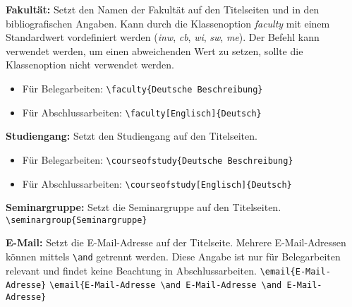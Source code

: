 \documentclass[
%
	thesis=paper,		%
	compactlistof,		%
	noauthorship,		%
%
	fancy,				%
%
%
]{hsmw-thesis}
\begin{document}
	\textbf{Fakultät:}\label{cmd:faculty}
	Setzt den Namen der Fakultät auf den Titelseiten und in den bibliografischen Angaben.
	Kann durch die Klassenoption \textit{faculty} mit einem Standardwert vordefiniert werden (\textit{inw}, \textit{cb}, \textit{wi}, \textit{sw}, \textit{me}).
	Der Befehl kann verwendet werden, um einen abweichenden Wert zu setzen, sollte die Klassenoption nicht verwendet werden.
	\begin{itemize}
		\item Für Belegarbeiten: \verb|\faculty{Deutsche Beschreibung}|
		\item Für Abschlussarbeiten: \verb|\faculty[Englisch]{Deutsch}|
	\end{itemize}
	
	\textbf{Studiengang:}\label{cmd:courseofstudy}
	Setzt den Studiengang auf den Titelseiten.
	\begin{itemize}
		\item Für Belegarbeiten: \verb|\courseofstudy{Deutsche Beschreibung}|
		\item Für Abschlussarbeiten: \verb|\courseofstudy[Englisch]{Deutsch}|
	\end{itemize}
	
	\textbf{Seminargruppe:}\label{cmd:seminargroup}
	Setzt die Seminargruppe auf den Titelseiten.
	\newline
	\verb|\seminargroup{Seminargruppe}|
	
	\textbf{E-Mail:}\label{cmd:email}
	Setzt die E-Mail-Adresse auf der Titelseite.
	Mehrere E-Mail-Adressen können mittels \verb|\and| getrennt werden.
	Diese Angabe ist nur für Belegarbeiten relevant und findet keine Beachtung in Abschlussarbeiten.
	\newline
	\verb|\email{E-Mail-Adresse}|
	\newline
	\verb|\email{E-Mail-Adresse \and E-Mail-Adresse \and E-Mail-Adresse}|
	
\end{document}
